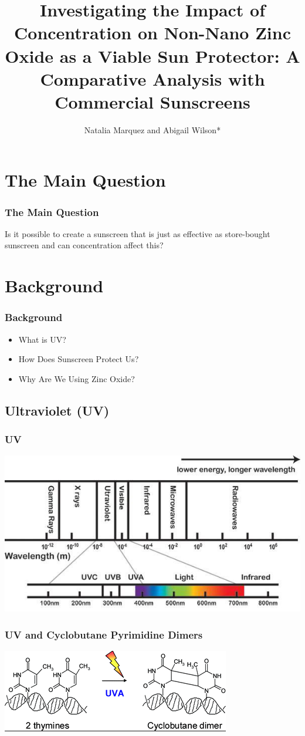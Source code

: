 \documentclass[10pt,aspectratio=169]{beamer} %
\title[The Effectiveness of Sunscreen]{Investigating the Impact of Concentration on Non-Nano Zinc Oxide as a Viable Sun Protector: A Comparative Analysis with Commercial Sunscreens}
\institute[ICR]{The Institute for Computing in Research}
\author{Natalia Marquez and Abigail Wilson*}
\begin{document}
\begin{frame}
  \titlepage
\end{frame}


\section{The Main Question}
\begin{frame}\centering
  \frametitle{The Main Question}
  Is it possible to create a sunscreen that is just as effective as store-bought sunscreen and can concentration affect this?
\end{frame}

\section{Background}
\begin{frame}
  \frametitle{Background}
  \begin{itemize}
    \item What is UV?
    \item How Does Sunscreen Protect Us?
    \item Why Are We Using Zinc Oxide?
  \end{itemize}
\end{frame}

\subsection{Ultraviolet (UV)}
\begin{frame}\centering
  \frametitle{UV}
  \includegraphics[scale = 0.7]{EMRSpectrum.jpg}
\end{frame}
\begin{frame}\centering
  \frametitle{UV and Cyclobutane Pyrimidine Dimers}
  \includegraphics{CPD.png}
\end{frame}
\end{document}

